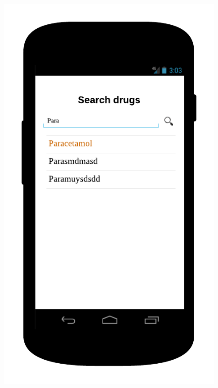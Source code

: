 \begin{figure}
\begin{minipage}{.5\textwidth}
  \includegraphics[width=.7\linewidth]{Images/mockups/browse.png}
\end{minipage}
\end{figure}

